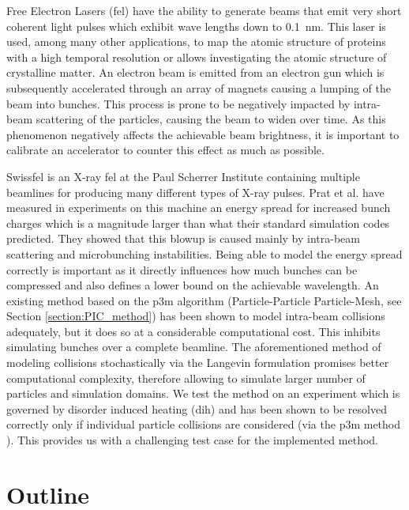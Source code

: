 Free Electron Lasers (\gls{fel}) have the ability to generate beams that emit very short coherent light
pulses which exhibit wave lengths down to 0.1\ nm.
This laser is used, among many other applications, to map the atomic structure of proteins with a
high temporal resolution or allows investigating the atomic structure of crystalline matter.
An electron beam is emitted from an electron gun which is subsequently accelerated through an array
of magnets causing a lumping of the beam into bunches.
This process is prone to be negatively impacted by intra-beam scattering of the particles, causing the beam to widen
over time.
As this phenomenon negatively affects the achievable beam brightness, it is important to calibrate an
accelerator to counter this effect as much as possible.

Swiss\gls{fel} is an X-ray \gls{fel} at the Paul Scherrer Institute containing multiple beamlines for producing
many different types of X-ray pulses.
Prat et al. \cite{prat2022energy} have measured in experiments on this machine an energy spread for increased bunch
charges which is a magnitude larger than what their standard simulation codes predicted.
They showed that this blowup is caused mainly by intra-beam scattering and microbunching instabilities.
Being able to model the energy spread correctly is important as it directly influences how much
bunches can be compressed and also defines a lower bound on the achievable wavelength.
An existing method \cite{p3m_ulmer} based on the \gls{p3m} algorithm
(Particle-Particle Particle-Mesh, see Section \ref{section:PIC_method}) has been shown to model
intra-beam collisions adequately, but it does so at a considerable computational cost.
This inhibits simulating bunches over a complete beamline.
The aforementioned method of modeling collisions stochastically via the Langevin formulation promises
better computational complexity, therefore allowing to simulate larger number of particles and simulation domains.
We test the method on an experiment which is governed by disorder induced heating (\gls{dih}) \cite{mitchell2015parallel} and has been
shown to be resolved correctly only if individual particle collisions are considered (via the
\gls{p3m} method \cite{p3m_ulmer}).
This provides us with a challenging test case for the implemented method.

\section{Outline}

